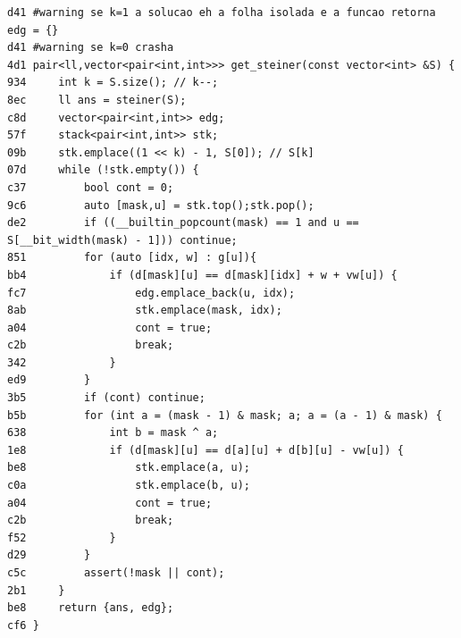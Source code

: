 \documentclass[11pt, a4paper, twoside]{article}
\begin{document}
\begin{lstlisting}
d41 #warning se k=1 a solucao eh a folha isolada e a funcao retorna edg = {}
d41 #warning se k=0 crasha
4d1 pair<ll,vector<pair<int,int>>> get_steiner(const vector<int> &S) {
934 	int k = S.size(); // k--;
8ec 	ll ans = steiner(S);
c8d 	vector<pair<int,int>> edg;
57f 	stack<pair<int,int>> stk;
09b 	stk.emplace((1 << k) - 1, S[0]); // S[k]
07d 	while (!stk.empty()) {
c37 		bool cont = 0;
9c6 		auto [mask,u] = stk.top();stk.pop();
de2 		if ((__builtin_popcount(mask) == 1 and u == S[__bit_width(mask) - 1])) continue;
851 		for (auto [idx, w] : g[u]){
bb4 			if (d[mask][u] == d[mask][idx] + w + vw[u]) {
fc7 				edg.emplace_back(u, idx);
8ab 				stk.emplace(mask, idx);
a04 				cont = true;
c2b 				break;
342 			}
ed9 		}
3b5 		if (cont) continue;
b5b 		for (int a = (mask - 1) & mask; a; a = (a - 1) & mask) {
638 			int b = mask ^ a;
1e8 			if (d[mask][u] == d[a][u] + d[b][u] - vw[u]) {
be8 				stk.emplace(a, u);
c0a 				stk.emplace(b, u);
a04 				cont = true;
c2b 				break;
f52 			}
d29 		}
c5c 		assert(!mask || cont);
2b1 	}
be8 	return {ans, edg};
cf6 }
\end{lstlisting}
\end{document}
